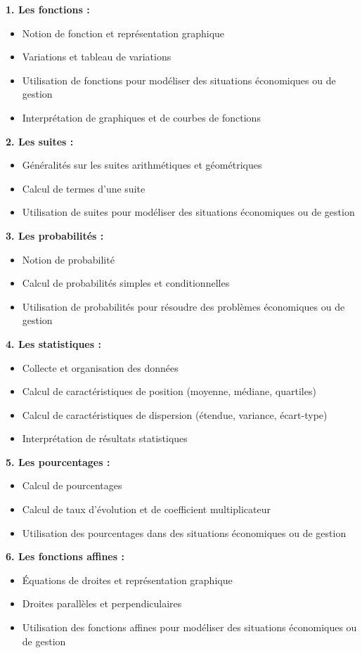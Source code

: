 \documentclass{article}
\begin{document}
\textbf{1. Les fonctions :}
\begin{itemize}
\item Notion de fonction et représentation graphique
\item Variations et tableau de variations
\item Utilisation de fonctions pour modéliser des situations économiques ou de gestion
\item Interprétation de graphiques et de courbes de fonctions
\end{itemize}

\textbf{2. Les suites :}
\begin{itemize}
\item Généralités sur les suites arithmétiques et géométriques
\item Calcul de termes d'une suite
\item Utilisation de suites pour modéliser des situations économiques ou de gestion
\end{itemize}

\textbf{3. Les probabilités :}
\begin{itemize}
\item Notion de probabilité
\item Calcul de probabilités simples et conditionnelles
\item Utilisation de probabilités pour résoudre des problèmes économiques ou de gestion
\end{itemize}

\textbf{4. Les statistiques :}
\begin{itemize}
\item Collecte et organisation des données
\item Calcul de caractéristiques de position (moyenne, médiane, quartiles)
\item Calcul de caractéristiques de dispersion (étendue, variance, écart-type)
\item Interprétation de résultats statistiques
\end{itemize}

\textbf{5. Les pourcentages :}
\begin{itemize}
\item Calcul de pourcentages
\item Calcul de taux d'évolution et de coefficient multiplicateur
\item Utilisation des pourcentages dans des situations économiques ou de gestion
\end{itemize}

\textbf{6. Les fonctions affines :}
\begin{itemize}
\item Équations de droites et représentation graphique
\item Droites parallèles et perpendiculaires
\item Utilisation des fonctions affines pour modéliser des situations économiques ou de gestion
\end{itemize}
\end{document}
